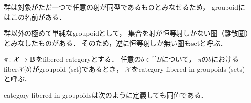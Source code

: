 \documentclass[a4paper, dvipdfmx]{jsarticle}
\begin{document}
    \begin{Remark}
        群は対象がただ一つで任意の射が同型であるものとみなせるため，
        groupoidにはこの名前がある．

        群以外の極めて単純なgroupoidとして，
        集合を射が恒等射しかない圏（離散圏）とみなしたものがある．
        そのため，逆に恒等射しか無い圏もsetと呼ぶ．
    \end{Remark}

    \begin{Def}
        $\pi \colon \mathcal{X} \to \mathbf{B}$をfibered categoryとする．
        任意の$b \in \cat{B}$について，
        $\pi$の$b$におけるfiber$\mathcal{X}(b)$がgroupoid (set)であるとき，
        $\mathcal{X}$をcategory fibered in groupoids (sets)と呼ぶ．
    \end{Def}
    category fibered in groupoidsは次のように定義しても同値である．
\end{document}
